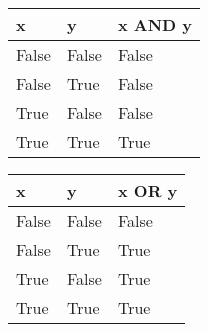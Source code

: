 \documentclass[twocolumn]{article}
\begin{document}
\begin{center}
	\begin{tabular}{| l | l || l |} 
		\hline
		x & y & x AND y \\ \hline
		False & False & False \\
		False & True & False \\
		True & False & False \\
		True & True & True \\
		\hline
	\end{tabular}
\end{center}

\begin{center}
	\begin{tabular}{| l | l || l |} 
		\hline
		x & y & x OR y \\ \hline
		False & False & False \\
		False & True & True \\
		True & False & True \\
		True & True & True \\
		\hline
	\end{tabular}
\end{center}
\end{document}
